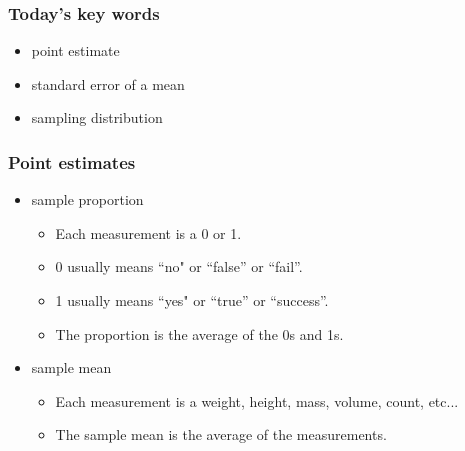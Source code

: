 
\begin{frame}
\frametitle{Today's key words}
\begin{itemize}
\item point estimate
\item standard error of a mean
\item sampling distribution
\end{itemize}
\end{frame}



\begin{frame}
\frametitle{Point estimates}
\begin{itemize}
\item sample proportion
\begin{itemize}
\item Each measurement is a 0 or 1.
\item 0 usually means ``no" or ``false'' or ``fail''.
\item 1 usually means ``yes" or ``true'' or ``success''.
\item The proportion is the average of the 0s and 1s.
\end{itemize}
\item sample mean
\begin{itemize}
\item Each measurement is a weight, height, mass, volume, count, etc...
\item The sample mean is the average of the measurements.
\end{itemize}
\end{itemize}
\end{frame}
